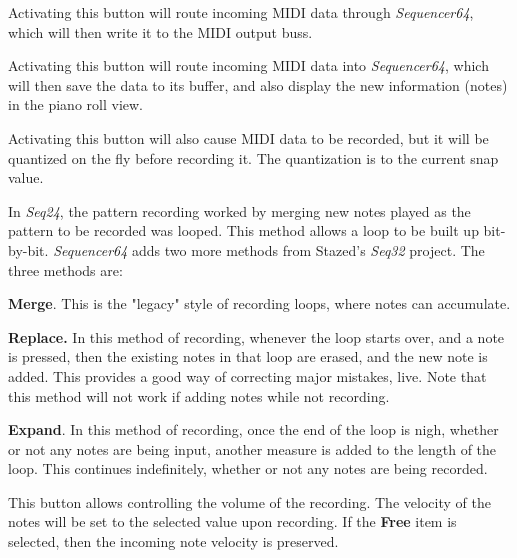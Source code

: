    Activating this button will route incoming MIDI data through
   \textsl{Sequencer64}, which will then write it to the MIDI output buss.

   Activating this button will route incoming MIDI data into
   \textsl{Sequencer64}, which will then save the data to its buffer, and also
   display the new information (notes) in the piano roll view.

   Activating this button will also cause MIDI data to be recorded, but it
   will be quantized on the fly before recording it.  The quantization is
   to the current snap value.

   In \textsl{Seq24}, the pattern recording worked by merging new notes played
   as the pattern to be recorded was looped.  This method allows a loop to be
   built up bit-by-bit.  \textsl{Sequencer64} adds two more methods from
   Stazed's \textsl{Seq32} project.  The three methods are:

   \begin{enumber}
      \item \textbf{Merge}. 
      This is the "legacy" style of recording loops, where notes can
      accumulate.
      \item \textbf{Replace.} 
      In this method of recording, whenever the loop starts over, and a note is
      pressed, then the existing notes in that loop are erased, and the new
      note is added.  This provides a good way of correcting major mistakes,
      live.  Note that this method will not work if adding notes while not
      recording.
      \item \textbf{Expand}. 
      In this method of recording, once the end of the loop is nigh, whether or
      not any notes are being input, another measure is added to the length of
      the loop.  This continues indefinitely, whether or not any notes are
      being recorded.
   \end{enumber}

   This button allows controlling the volume of the recording.
   The velocity of the notes will be set to the selected value upon recording.
   If the \textbf{Free} item is selected, then the incoming note velocity is
   preserved.

